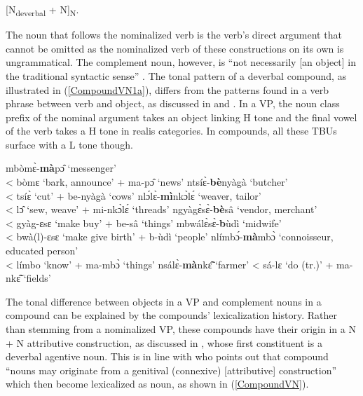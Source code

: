 \begin{exe}
\ex\label{CompoundTemp} [N\textsubscript{deverbal} + N]\textsubscript{N}.
\end{exe}

The noun that follows the nominalized verb is the verb's direct argument that cannot be omitted as the nominalized verb of these constructions on its own is ungrammatical. The complement noun, however, is ``not necessarily [an object] in the traditional syntactic sense'' \citep{schadeberg2003}. The tonal pattern of a deverbal compound, as illustrated in (\ref{CompoundVN1a}), differs from the patterns found in a verb phrase between verb and object, as discussed in  and . In a VP, the noun class prefix of the nominal argument takes an object linking H tone and the final vowel of the verb takes a H tone in realis categories.  In compounds, all these TBUs surface with a L tone though. 

\begin{exe}
\ex\label{CompoundVN1a} 
\begin{xlist}
\ex mbòmɛ̀-{\bfseries mà}pɔ̂ `messenger' \\ < bòmɛ `bark, announce' + ma-pɔ̂ `news'
\ex ntsíɛ̀-{\bfseries bè}nyàgà `butcher' \\ < tsíɛ̀ `cut' + be-nyàgà `cows'
\ex nlɔ́lɛ̀-{\bfseries mì}nkɔ̀lɛ́  `weaver, tailor' \\ <  lɔ̂ `sew, weave' + mi-nkɔ̀lɛ́ `threads'
\ex ngyàgɛ̀sɛ̀-{\bfseries bè}sâ `vendor, merchant' \\ < gyàg-ɛsɛ `make buy' + be-sâ `things'
\ex mbwálɛ̀sɛ̀-{\bfseries b}ùdì `midwife' \\ < bwà(l)-ɛsɛ `make give birth' + b-ùdì `people'
\ex nlímbɔ́-{\bfseries mà}mbɔ̀ `connoisseur, educated person' \\ <  límbo `know' + ma-mbɔ̀ `things'
\ex nsálɛ̀-{\bfseries mà}nkɛ̃̂ `farmer' < sá-lɛ `do (tr.)' + ma-nkɛ̃̂ `fields'
\end{xlist}
\end{exe}

The tonal difference between objects in a VP and complement nouns in a compound can be explained by the compounds' lexicalization history. Rather than stemming from a nominalized VP, these compounds have their origin in a N + N attributive construction, as discussed in , whose first constituent is a deverbal agentive noun. This is in line with \citet[87]{schadeberg2003} who points out that compound ``nouns may originate from a genitival (connexive) [attributive] construction'' which then become lexicalized as noun, as shown in (\ref{CompoundVN}). 

